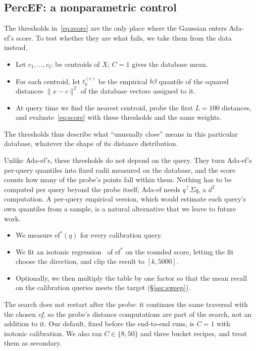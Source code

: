 \documentclass[10pt,journal,compsoc]{IEEEtran}
\makeatletter
\newcommand{\ef}{\textit{ef}}
\renewcommand\paragraph{\@startsection{paragraph}{4}{\z@}{1.5ex plus 1ex minus .2ex}{-1em}{\normalfont\normalsize\itshape}}
\makeatother
\begin{document}
\subsection{PercEF: a nonparametric control}

The thresholds in~\eqref{eq:score} are the only place where the Gaussian enters Ada-ef's score.
To test whether they are what fails, we take them from the data instead.
\begin{itemize}
\item Let $c_1,\dots,c_C$ be centroids of $X$; $C = 1$ gives the database mean.
\item For each centroid, let $t^{(c)}_b$ be the empirical $b\beta$ quantile of the squared distances
  $\lVert x - c \rVert^2$ of the database vectors assigned to it.
\item At query time we find the nearest centroid, probe the first $L = 100$ distances, and
  evaluate~\eqref{eq:score} with these thresholds and the same weights.
\end{itemize}
The thresholds thus describe what ``unusually close'' means in this particular database, whatever
the shape of its distance distribution.

Unlike Ada-ef's, these thresholds do not depend on the query. They turn Ada-ef's per-query quantiles
into fixed radii measured on the database, and the score counts how many of the probe's points fall
within them. Nothing has to be computed per query beyond the probe itself; Ada-ef needs
$q^\top\Sigma q$, a $d^2$ computation. A per-query empirical version, which would estimate each
query's own quantiles from a sample, is a natural alternative that we leave to future work.

\paragraph{Calibration.}
\begin{itemize}
\item We measure $\mathrm{ef}^*(q)$ for every calibration query.
\item We fit an isotonic regression~\cite{barlow1972isotonic} of $\mathrm{ef}^*$ on the rounded
  score, letting the fit choose the direction, and clip the result to $[k, 5000]$.
\item Optionally, we then multiply the table by one factor so that the mean recall on the
  calibration queries meets the target (\S\ref{sec:sweep}).
\end{itemize}
The search does not restart after the probe: it continues the same traversal with the chosen \ef{},
so the probe's distance computations are part of the search, not an addition to it. Our default,
fixed before the end-to-end runs, is $C = 1$ with isotonic calibration. We also ran
$C \in \{8, 50\}$ and three bucket recipes, and treat them as secondary.
\end{document}

